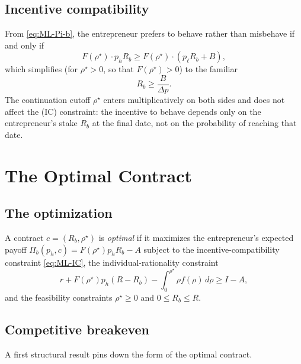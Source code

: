 \documentclass[11pt,a4paper,oneside]{book}
\def\leq{\leqslant}
\def\geq{\geqslant}
\theoremstyle{plain}
\theoremstyle{definition}
\theoremstyle{remark}
\numberwithin{equation}{chapter}
\begin{document}
\subsection{Incentive compatibility}

From \eqref{eq:ML-Pi-b}, the entrepreneur prefers to behave rather than misbehave if and only if
\begin{equation*}
  F(\rho^\star) \cdot p_h R_b \geq F(\rho^\star) \cdot (p_\ell R_b + B),
\end{equation*}
which simplifies (for $\rho^\star > 0$, so that $F(\rho^\star) > 0$) to the familiar
\begin{equation}\label{eq:ML-IC}
  R_b \geq \frac{B}{\Delta p}.
  \tag{IC}
\end{equation}
The continuation cutoff $\rho^\star$ enters multiplicatively on both sides and does not affect the (IC) constraint: the incentive to behave depends only on the entrepreneur's stake $R_b$ at the final date, not on the probability of reaching that date.

\section{The Optimal Contract}
\label{sec:ML-optimal}

\subsection{The optimization}

A contract $c = (R_b, \rho^\star)$ is \emph{optimal} if it maximizes the entrepreneur's expected payoff $\Pi_b(p_h, c) = F(\rho^\star) p_h R_b - A$ subject to the incentive-compatibility constraint \eqref{eq:ML-IC}, the individual-rationality constraint
\begin{equation}\label{eq:ML-IR}
  r + F(\rho^\star) p_h (R - R_b) - \int_0^{\rho^\star} \rho f(\rho) \, d\rho \geq I - A,
  \tag{IR}
\end{equation}
and the feasibility constraints $\rho^\star \geq 0$ and $0 \leq R_b \leq R$.

\subsection{Competitive breakeven}

A first structural result pins down the form of the optimal contract.
\end{document}
